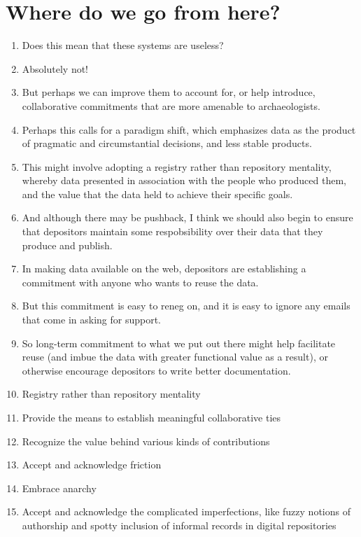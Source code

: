 \documentclass{article}
\begin{document}
\section{Where do we go from here?}
\begin{enumerate}
  \item Does this mean that these systems are useless?
  \item Absolutely not!
  \item But perhaps we can improve them to account for, or help introduce, collaborative commitments that are more amenable to archaeologists.
  \item Perhaps this calls for a paradigm shift, which emphasizes data as the product of pragmatic and circumstantial decisions, and less stable products.
  \item This might involve adopting a registry rather than repository mentality, whereby data presented in association with the people who produced them, and the value that the data held to achieve their specific goals.
  \item And although there may be pushback, I think we should also begin to ensure that depositors maintain some respobsibility over their data that they produce and publish.
  \item In making data available on the web, depositors are establishing a commitment with anyone who wants to reuse the data.
  \item But this commitment is easy to reneg on, and it is easy to ignore any emails that come in asking for support.
  \item So long-term commitment to what we put out there might help facilitate reuse (and imbue the data with greater functional value as a result), or otherwise encourage depositors to write better documentation.
  
  \item Registry rather than repository mentality
  \item Provide the means to establish meaningful collaborative ties
  \item Recognize the value behind various kinds of contributions
  \item Accept and acknowledge friction
  \item Embrace anarchy

  \item Accept and acknowledge the complicated imperfections, like fuzzy notions of authorship and spotty inclusion of informal records in digital repositories
\end{enumerate}
\end{document}
